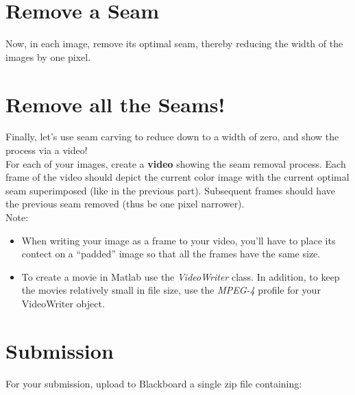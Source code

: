 \documentclass[12pt]{article}
\begin{document}
\newpage

\section{Remove a Seam}
Now, in each image, remove its optimal seam, thereby reducing the width of the images by one pixel.


\section{Remove all the Seams!}
Finally, let's use seam carving to reduce down to a width of zero, and show the process via a video!\\

\noindent
For each of your images, create a \textbf{video} showing the seam removal process.  Each frame of the video should depict the current color image with the current optimal seam superimposed (like in the previous part). Subsequent frames should have the previous seam removed (thus be one pixel narrower).\\

\noindent
Note:
\begin{itemize}
\item When writing your image as a frame to your video, you'll have to place its contect on a  “padded” image so that all the frames have the same size.
\item To create a movie in Matlab use the \emph{VideoWriter} class.  In addition, to keep the movies relatively small in file size, use the \emph{MPEG-4} profile for your VideoWriter object.
\end{itemize}

\newpage
\section*{Submission}
For your submission, upload to Blackboard a single zip file containing:
\end{document}
